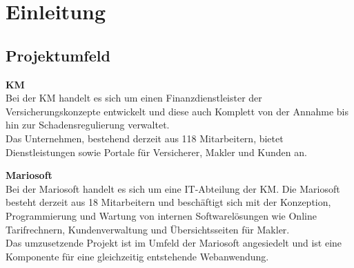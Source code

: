 \newpage

\section{Einleitung}
\label{einleitung}

\subsection{Projektumfeld}
\label{projektumfeld}
\textbf{\acl{KM}}
\\

Bei der \ac{KM} handelt es sich um einen Finanzdienstleister der Versicherungskonzepte entwickelt und diese auch Komplett von der Annahme bis hin zur Schadensregulierung verwaltet.\\
Das Unternehmen, bestehend derzeit aus 118 Mitarbeitern, bietet Dienstleistungen sowie Portale für Versicherer, Makler und Kunden an.

\textbf{Mariosoft}
\\

Bei der Mariosoft handelt es sich um eine IT-Abteilung der \ac{KM}. Die Mariosoft besteht derzeit aus 18 Mitarbeitern und beschäftigt sich mit der Konzeption, Programmierung und Wartung von internen Softwarelösungen wie Online Tarifrechnern, Kundenverwaltung und Übersichtsseiten für Makler.
\\
Das umzusetzende Projekt ist im Umfeld der Mariosoft angesiedelt und ist eine Komponente für eine gleichzeitig entstehende Webanwendung.

